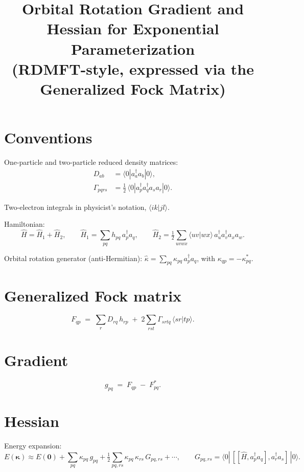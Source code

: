 \documentclass[11pt]{article}
\title{Orbital Rotation Gradient and Hessian for Exponential Parameterization\\
\large (RDMFT-style, expressed via the Generalized Fock Matrix)}
\author{}
\date{}
\newcommand{\ccr}[1]{a_{#1}^{\dagger}}
\newcommand{\ann}[1]{a_{#1}}
\begin{document}
\maketitle

\section*{Conventions}

One-particle and two-particle reduced density matrices:
\begin{align}
D_{ab} &= \langle 0 | \ccr{a}\ann{b} | 0\rangle, \\
\Gamma_{pqrs} &= \tfrac{1}{2}\,\langle 0 | \ccr{p}\ccr{q}\ann{s}\ann{r} | 0\rangle .
\end{align}

Two-electron integrals in physicist's notation, $\langle ik|jl\rangle$.

Hamiltonian:
\begin{equation}
\hat H = \hat H_1 + \hat H_2, \qquad
\hat H_1 = \sum_{pq} h_{pq}\,\ccr{p}\ann{q}, \qquad
\hat H_2 = \tfrac12 \sum_{uvwx} \langle uv|wx\rangle\, \ccr{u}\ccr{v}\ann{x}\ann{w}.
\end{equation}

Orbital rotation generator (anti-Hermitian): $\hat\kappa = \sum_{pq}\kappa_{pq}\,\ccr{p}\ann{q}$,
with $\kappa_{qp} = -\kappa_{pq}^{*}$.

\section*{Generalized Fock matrix}

\begin{equation}
F_{qp} \;=\; \sum_{r} D_{rq}\,h_{rp} \;+\; 2\sum_{rst} \Gamma_{srtq}\,\langle sr|tp\rangle .
\end{equation}

\section*{Gradient}

\begin{equation}
g_{pq} \;=\; F_{qp} \;-\; F_{pq}^{*}.
\end{equation}

\section*{Hessian}

Energy expansion:
\begin{equation}
E(\boldsymbol\kappa) \approx E(\mathbf 0) + \sum_{pq}\kappa_{pq}\,g_{pq}
+ \tfrac12 \sum_{pq,rs}\kappa_{pq}\,\kappa_{rs}\,G_{pq,rs} + \cdots,
\qquad
G_{pq,rs} = \langle 0|\,[[\hat H,\ccr{p}\ann{q}],\ccr{r}\ann{s}]\,|0\rangle .
\end{equation}
\end{document}
